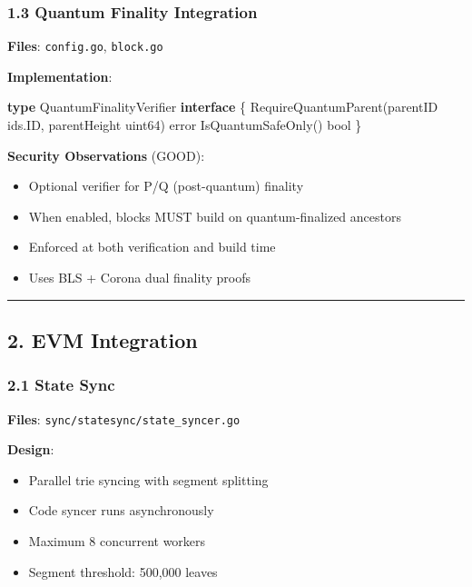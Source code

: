 \documentclass[
]{article}
\newenvironment{Shaded}{}{}
\newcommand{\DataTypeTok}[1]{\textcolor[rgb]{0.56,0.13,0.00}{#1}}
\newcommand{\KeywordTok}[1]{\textcolor[rgb]{0.00,0.44,0.13}{\textbf{#1}}}
\newcommand{\NormalTok}[1]{#1}
\newcommand{\OperatorTok}[1]{\textcolor[rgb]{0.40,0.40,0.40}{#1}}
\providecommand{\tightlist}{%
  \setlength{\itemsep}{0pt}\setlength{\parskip}{0pt}}
\begin{document}
\subsubsection{1.3 Quantum Finality
Integration}\label{13-quantum-finality-integration}

\textbf{Files}: \texttt{config.go}, \texttt{block.go}

\textbf{Implementation}:

\begin{Shaded}
\begin{Highlighting}[]
\KeywordTok{type}\NormalTok{ QuantumFinalityVerifier }\KeywordTok{interface} \OperatorTok{\{}
\NormalTok{    RequireQuantumParent}\OperatorTok{(}\NormalTok{parentID ids}\OperatorTok{.}\NormalTok{ID}\OperatorTok{,}\NormalTok{ parentHeight }\DataTypeTok{uint64}\OperatorTok{)} \DataTypeTok{error}
\NormalTok{    IsQuantumSafeOnly}\OperatorTok{()} \DataTypeTok{bool}
\OperatorTok{\}}
\end{Highlighting}
\end{Shaded}

\textbf{Security Observations} (GOOD):

\begin{itemize}
\tightlist
\item
  Optional verifier for P/Q (post-quantum) finality
\item
  When enabled, blocks MUST build on quantum-finalized ancestors
\item
  Enforced at both verification and build time
\item
  Uses BLS + Corona dual finality proofs
\end{itemize}

\begin{center}\rule{0.5\linewidth}{0.5pt}\end{center}

\subsection{2. EVM Integration}\label{2-evm-integration}

\subsubsection{2.1 State Sync}\label{21-state-sync}

\textbf{Files}: \texttt{sync/statesync/state\_syncer.go}

\textbf{Design}:

\begin{itemize}
\tightlist
\item
  Parallel trie syncing with segment splitting
\item
  Code syncer runs asynchronously
\item
  Maximum 8 concurrent workers
\item
  Segment threshold: 500,000 leaves
\end{itemize}
\end{document}
